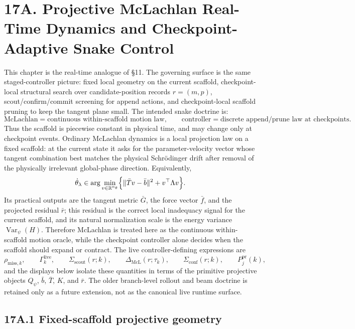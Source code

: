 \documentclass[11pt]{article}
\begin{document}
\appendix

\newpage

\section*{17A. Projective McLachlan Real-Time Dynamics and Checkpoint-Adaptive Snake Control}

This chapter is the real-time analogue of §11. The governing surface is the same staged-controller picture: fixed local geometry on the current scaffold, checkpoint-local structural search over candidate-position records \(r=(m,p)\), scout/confirm/commit screening for append actions, and checkpoint-local scaffold pruning to keep the tangent plane small. The intended snake doctrine is:
\[
\text{McLachlan}=\text{continuous within-scaffold motion law},
\qquad
\text{controller}=\text{discrete append/prune law at checkpoints}.
\]
Thus the scaffold is piecewise constant in physical time, and may change only at checkpoint events. Ordinary McLachlan dynamics is a local projection law on a fixed scaffold: at the current state it asks for the parameter-velocity vector whose tangent combination best matches the physical Schr\"odinger drift after removal of the physically irrelevant global-phase direction. Equivalently,
\[
\dot\theta_\lambda\in\arg\min_{v\in\mathbb R^{n_\theta}}
\Bigl\{
\|\bar T v-\bar b\|^2+v^\top\Lambda v
\Bigr\}.
\]
Its practical outputs are the tangent metric \(\bar G\), the force vector \(\bar f\), and the projected residual \(\bar r\); this residual is the correct local inadequacy signal for the current scaffold, and its natural normalization scale is the energy variance \(\operatorname{Var}_\psi(H)\). Therefore McLachlan is treated here as the continuous within-scaffold motion oracle, while the checkpoint controller alone decides when the scaffold should expand or contract.
The live controller-defining expressions are
\[
\rho_{\mathrm{miss},k},
\qquad
\Gamma_k^{\mathrm{live}},
\qquad
\Sigma_{\mathrm{scout}}(r;k),
\qquad
\Delta_{\mathrm{McL}}(r;\tau_k),
\qquad
\Sigma_{\mathrm{conf}}(r;k),
\qquad
P_j^{\mathrm{pr}}(k),
\]
and the displays below isolate these quantities in terms of the primitive projective objects \(Q_\psi\), \(\bar b\), \(\bar T\), \(K\), and \(\bar r\). The older branch-level rollout and beam doctrine is retained only as a future extension, not as the canonical live runtime surface.

\subsection*{17A.1 Fixed-scaffold projective geometry}
\end{document}
